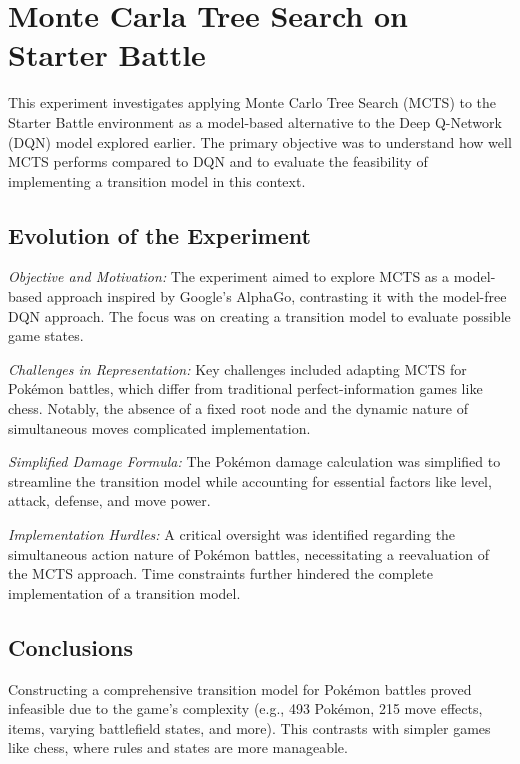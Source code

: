 \section{Monte Carla Tree Search on Starter Battle}

This experiment investigates applying Monte Carlo Tree Search (MCTS) to the Starter Battle environment as a model-based alternative to the Deep Q-Network (DQN) model explored earlier. The primary objective was to understand how well MCTS performs compared to DQN and to evaluate the feasibility of implementing a transition model in this context.

\subsection{Evolution of the Experiment}

\emph{Objective and Motivation:}
\indent The experiment aimed to explore MCTS as a model-based approach inspired by Google's AlphaGo, contrasting it with the model-free DQN approach. The focus was on creating a transition model to evaluate possible game states.

\emph{Challenges in Representation:}
\indent Key challenges included adapting MCTS for Pokémon battles, which differ from traditional perfect-information games like chess. Notably, the absence of a fixed root node and the dynamic nature of simultaneous moves complicated implementation.

\emph{Simplified Damage Formula:}
\indent The Pokémon damage calculation was simplified to streamline the transition model while accounting for essential factors like level, attack, defense, and move power.

\emph{Implementation Hurdles:}
\indent A critical oversight was identified regarding the simultaneous action nature of Pokémon battles, necessitating a reevaluation of the MCTS approach. Time constraints further hindered the complete implementation of a transition model.

\subsection{Conclusions}

Constructing a comprehensive transition model for Pokémon battles proved infeasible due to the game's complexity (e.g., 493 Pokémon, 215 move effects, items, varying battlefield states, and more). This contrasts with simpler games like chess, where rules and states are more manageable.

